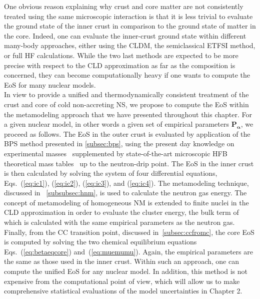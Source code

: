 One obvious reason explaining why crust and core matter are not consistently 
treated using the same microscopic interaction is that it is less trivial to 
evaluate the ground state of the inner crust in comparison to the ground state
of matter in the core. Indeed, one can evaluate the inner-crust ground state
within different many-body approaches, either using the CLDM, the
semiclassical ETFSI method, or full HF calculations. While 
the two last methods are expected to be more precise with respect to the CLD 
approximation as far as the composition is concerned, they can become 
computationally heavy if one wants to compute the EoS for many nuclear 
models.  \\
In view to provide a unified and thermodynamically consistent treatment of the
crust and core of cold non-accreting NS, we propose to compute the EoS within 
the metamodeling approach that we have presented throughout this chapter. For
a given nuclear model, in other words a given set of empirical parameters
$\bm{P_\alpha}$, we proceed as follows. The EoS in the outer crust is
evaluated by application of the BPS method presented in \ref{subsec:bps}, using 
the present day knowledge on experimental masses~\cite{Huang2017} supplemented 
by state-of-the-art microscopic HFB theoretical mass tables~\cite{Goriely2013} 
up to the neutron-drip point. The EoS in the inner crust is then calculated
by solving the system of four differential equations, Eqs.~(\ref{eq:ic1}),
(\ref{eq:ic2}), (\ref{eq:ic3}), and (\ref{eq:ic4}). The metamodeling technique,
discussed in ~\ref{subsubsec:hnm}, is used to calculate the neutron gas energy.
The concept of metamodeling of homogeneous NM is extended to finite nuclei in the
CLD approximation in order to evaluate the cluster energy, the bulk term of
which is calculated with the same empirical parameters as the neutron gas. 
Finally, from the CC transition point, discussed in~\ref{subsec:ccfromc}, the 
core EoS is computed by solving the two chemical equilibrium equations
Eqs.~(\ref{eq:betaeqcore}) and~(\ref{eq:muemumu}). Again, the empirical
parameters are the same as those used in the inner crust. Within such an 
approach, one can compute the unified EoS for any nuclear model.
In addition, this method is not expensive from the computational point of view,
which will allow us to make comprehensive statistical evaluations of the model
uncertainties in Chapter 2. 

